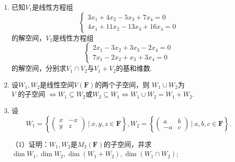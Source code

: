 \begin{enumerate}
    \item 已知$V_1$是线性方程组$$\begin{cases}
		3x_1+4x_2-5x_3+7x_4=0 \\
		4x_1+11x_2-13x_3+16x_4=0
	\end{cases}$$
	的解空间，$V_2$是线性方程组$$\begin{cases}
		2x_1-3x_2+3x_3-2x_4=0 \\
		7x_1-2x_2+x_3+3x_4=0
	\end{cases}$$
	的解空间，分别求$V_1 \cap V_2$与$V_1+V_2$的基和维数.
    \item 设$W_1,W_2$是线性空间$V(\mathbf{F})$的两个子空间，则
    $W_1 \cup W_2$为$V\text{ 的子空间 } \iff W_1 \subseteq W_2$或$W_2 \subseteq W_1 \iff W_1 \cup W_2=W_1+W_2$.
    \item 设$$W_1=\left\{\begin{pmatrix}
		x & -x \\ y & z
	\end{pmatrix}\ \bigg|\ x,y,z\in \mathbf{F} \right\},W_2=\left\{\begin{pmatrix}
		a & b \\ -a & c
	\end{pmatrix}\ \bigg|\ a,b,c\in \mathbf{F} \right\}.$$

	（1）证明：$W_1,W_2$是$M_2(\mathbf{F})$的子空间，并求$\dim W_1,\dim W_2,\dim(W_1+W_2),\dim(W_1\cap W_2)$;


\end{enumerate}
